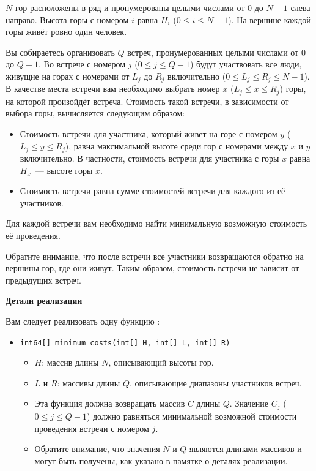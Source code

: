 $N$ гор расположены в ряд и пронумерованы целыми числами от $0$ до $N-1$ слева
направо. Высота горы с номером $i$ равна $H_i$ ($0\le i\le N-1$). На вершине каждой
горы живёт ровно один человек.

Вы собираетесь организовать $Q$ встреч, пронумерованных целыми числами от $0$ до
$Q-1$. Во встрече с номером $j$ ($0 \le j 
\le Q-1$) будут участвовать все люди,
живущие на горах с номерами от $L_j$ до $R_j$ включительно ($0\le L_j \le R_j \le N-1$). В
качестве места встречи вам необходимо выбрать номер $x$ ($L_j \le x \le R_j$) горы, на
которой произойдёт встреча. Стоимость такой встречи, в зависимости от выбора
горы, вычисляется следующим образом:
\begin{itemize}
    \item Стоимость встречи для участника, который живет на горе с номером
$y$ ($L_j \le y \le R_j$), равна максимальной высоте среди гор с номерами между $x$ и $y$
включительно. В частности, стоимость встречи для участника с горы $x$ равна $H_x$~--- высоте горы $x$.

\item Стоимость встречи равна сумме стоимостей встречи для каждого из её
участников.
\end{itemize}


Для каждой встречи вам необходимо найти минимальную возможную стоимость
её проведения.

Обратите внимание, что после встречи все участники возвращаются обратно на
вершины гор, где они живут. Таким образом, стоимость встречи не зависит от
предыдущих встреч.


\textbf{Детали реализации}

Вам следует реализовать одну функцию :

\begin{itemize}
    \item \texttt{int64[] minimum\_costs(int[] H, int[] L, int[] R)}
    \begin{itemize}
        \item $H$: массив длины $N$, описывающий высоты гор.
        \item $L$ и $R$: массивы длины $Q$, описывающие диапазоны участников встреч.
        \item Эта функция должна возвращать массив $C$ длины $Q$. Значение $C_j$ ($0\le j\le Q-1$)
должно равняться минимальной возможной стоимости
проведения встречи с номером $j$.
\item Обратите внимание, что значения $N$ и $Q$ являются длинами массивов и могут быть получены, как указано в памятке о деталях реализации.
    \end{itemize}
\end{itemize}


